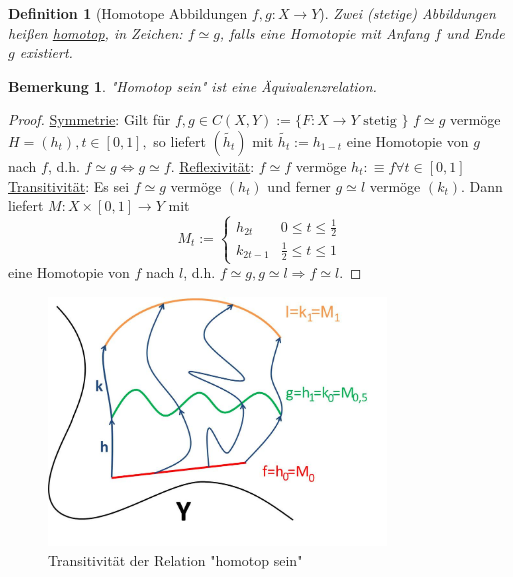 \documentclass[a4paper,11pt,notitlepage]{report}
\newtheorem{definition}{Definition}[chapter]
\newtheorem{remark}{Bemerkung}[chapter]
\begin{document}
\begin{definition}[Homotope Abbildungen $f,g \colon X \rightarrow Y$]
	Zwei (stetige) Abbildungen heißen \underline{homotop}, in Zeichen: $f \simeq g$, falls eine Homotopie mit Anfang $f$ und Ende $g$ existiert.
\end{definition}

\begin{remark}
"Homotop sein" ist eine Äquivalenzrelation.
\end{remark}

\begin{proof}
	\underline{Symmetrie}:
	Gilt für $f,g \in C(X,Y) := \{F \colon X \rightarrow Y \text{ stetig } \}$ $f \simeq g$ vermöge $H=(h_t), t \in [0,1],$ so liefert $(\tilde{h_t})$ mit $\tilde{h_t}:=h_{1-t}$ eine Homotopie von $g$ nach $f$, d.h. $f \simeq g \Leftrightarrow g \simeq f$.
	\newline
	\underline{Reflexivität}:
	$f \simeq f$ vermöge $h_t : \equiv f \forall t \in [0,1]$
	\newline
	\underline{Transitivität}:
	Es sei $f \simeq g$ vermöge $(h_t)$ und ferner $g \simeq l$ vermöge $(k_t)$.
	Dann liefert $M \colon X \times [0,1] \rightarrow Y$ mit
	$$M_t := \begin{cases} h_{2t} & 0 \leq t \leq \frac{1}{2} \\
	k_{2t-1} & \frac{1}{2} \leq t \leq 1
	\end{cases}$$
	eine Homotopie von $f$ nach $l$, d.h. $f \simeq g, g \simeq l \Rightarrow f \simeq l$.
\end{proof}

\begin{figure}[h]
\centering
\includegraphics[width=0.8\textwidth]{images/Homotopie_Transitivitaet.jpg}
\caption{Transitivität der Relation "homotop sein"}
\end{figure}
\end{document}
